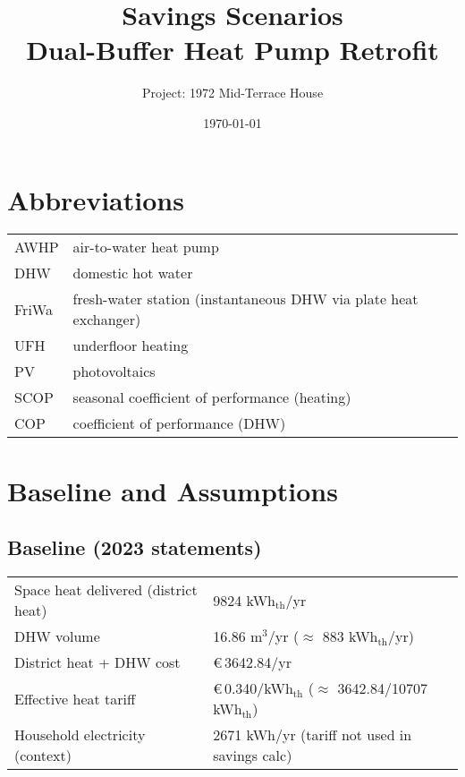 \documentclass[11pt,oneside]{report}
\title{Savings Scenarios\\Dual-Buffer Heat Pump Retrofit}
\author{Project: 1972 Mid-Terrace House}
\date{\today}
\begin{document}
\maketitle
\tableofcontents
\clearpage

\chapter{Abbreviations}
\begin{longtable}{@{}ll@{}}
\toprule
AWHP & air-to-water heat pump \\
DHW & domestic hot water \\
FriWa & fresh-water station (instantaneous DHW via plate heat exchanger) \\
UFH & underfloor heating \\
PV & photovoltaics \\
SCOP & seasonal coefficient of performance (heating) \\
COP & coefficient of performance (DHW) \\
\bottomrule
\end{longtable}

\chapter{Baseline and Assumptions}

\section{Baseline (2023 statements)}
\begin{tabularx}{\textwidth}{@{}l>{\raggedleft\arraybackslash}X@{}}
\toprule
Space heat delivered (district heat) & \num{9824} kWh$_\mathrm{th}$/yr \\
DHW volume & \num{16.86} m$^3$/yr (\(\approx\) \num{883} kWh$_\mathrm{th}$/yr) \\
District heat + DHW cost & \euro\,\num{3642.84}/yr \\
Effective heat tariff & \euro\,\num{0.340}/kWh$_\mathrm{th}$ (\(\approx\) \num{3642.84}/\num{10707} kWh$_\mathrm{th}$) \\
Household electricity (context) & \num{2671} kWh/yr (tariff not used in savings calc) \\
\bottomrule
\end{tabularx}
\end{document}
